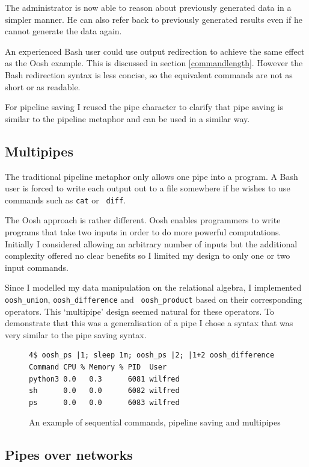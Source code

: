 \documentclass[12pt,twoside,notitlepage]{report}
\begin{document}
The administrator is now able to reason about previously generated data in a
simpler manner. He can also refer back to previously generated results
even if he cannot generate the data again.

An experienced Bash user could use output redirection to achieve the
same effect as the Oosh example. This is discussed in section
\ref{commandlength}. However the Bash redirection syntax is less
concise, so the equivalent commands are not as short or as readable.

For pipeline saving I reused the pipe character to clarify that pipe
saving is similar to the pipeline metaphor and can be used in a
similar way.

\subsection{Multipipes}

The traditional pipeline metaphor only allows one pipe into a
program. A Bash user is forced to write each output out to a file
somewhere if he wishes to use commands such as {\tt cat} or {\tt
  diff}.

The Oosh approach is rather different. Oosh enables programmers to
write programs that take two inputs in order to do more powerful
computations. Initially I considered allowing an arbitrary number of
inputs but the additional complexity offered no clear benefits so I
limited my design to only one or two input commands.

Since I modelled my data manipulation on the relational algebra, I
implemented {\tt oosh\_union}, {\tt oosh\_difference} and {\tt
  oosh\_product} based on their corresponding operators. This
`multipipe' design seemed natural for these operators. To demonstrate
that this was a generalisation of a pipe I chose a syntax that was
very similar to the pipe saving syntax.

\begin{figure}
\caption{An example of sequential commands, pipeline saving and multipipes}
\begin{verbatim}
4$ oosh_ps |1; sleep 1m; oosh_ps |2; |1+2 oosh_difference
Command CPU % Memory % PID  User
python3 0.0   0.3      6081 wilfred
sh      0.0   0.0      6082 wilfred
ps      0.0   0.0      6083 wilfred
\end{verbatim}
\end{figure}

\subsection{Pipes over networks}
\end{document}
